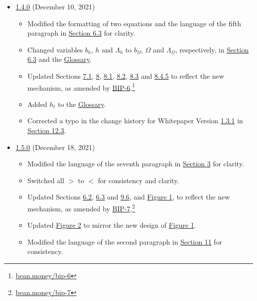 \documentclass[class=article, crop=false]{standalone}
\begin{document}
\begin{itemize}[topsep=0pt, itemsep=3pt,leftmargin=16pt]
    \item \href{https://github.com/BeanstalkFarms/Beanstalk-Whitepaper/blob/master/version-history/beanstalk1_4_0.pdf}{1.4.0} (December 10, 2021)
    
    \begin{itemize}
        \item Modified the formatting of two equations and the language of the fifth paragraph in \hyperlink{subsection.6.3}{Section 6.3} for clarity.
        \item Changed variables $b_h$, $h$ and $\Lambda_h$ to $b_{\Omega}$, $\Omega$ and $\Lambda_{\Omega}$, respectively, in \hyperlink{subsection.6.3}{Section 6.3} and the \hyperlink{subsection.14.11}{Glossary}.
        \item Updated Sections \hyperlink{subsection.7.1}{7.1}, \hyperlink{section.8}{8}, \hyperlink{subsection.8.1}{8.1}, \hyperlink{subsection.8.2}{8.2}, \hyperlink{subsection.8.3}{8.3} and \hyperlink{subsubsection.8.4.5}{8.4.5} to reflect the new  mechanism, as amended by \href{https://bean.money/bip-6}{BIP-6}.\footnote{\href{https://bean.money/bip-6}{bean.money/bip-6}}
        \item Added $h_t$ to the \hyperlink{subsection.14.11}{Glossary}. 
        \item Corrected a typo in the change history for Whitepaper Version \href{https://github.com/BeanstalkFarms/Beanstalk-Whitepaper/blob/master/version-history/beanstalk1_3_1.pdf}{1.3.1} in \hyperlink{subsection.12.3}{Section 12.3}.
    \end{itemize}
    
    \item \href{https://github.com/BeanstalkFarms/Beanstalk-Whitepaper/blob/master/version-history/beanstalk1_5_0.pdf}{1.5.0} (December 18, 2021)
    
    \begin{itemize}
        \item Modified the language of the seventh paragraph in \hyperlink{section.6.3}{Section 3} for clarity.
        \item Switched all $>$ to $<$ for consistency and clarity.
        \item Updated Sections \hyperlink{subsection.6.2}{6.2}, \hyperlink{subsection.6.3}{6.3} and \hyperlink{subsection.9.6}{9.6}, and \hyperref[fig 1]{Figure 1}, to reflect the new  mechanism, as amended by \href{https://bean.money/bip-7}{BIP-7}.\footnote{\href{https://bean.money/bip-7}{bean.money/bip-7}}
        \item Updated \hyperref[fig 2]{Figure 2} to mirror the new design of \hyperref[fig 1]{Figure 1}. 
        \item Modified the language of the second paragraph in \hyperlink{section.11}{Section 11} for consistency.
    \end{itemize}
    

\end{itemize}
\end{document}
